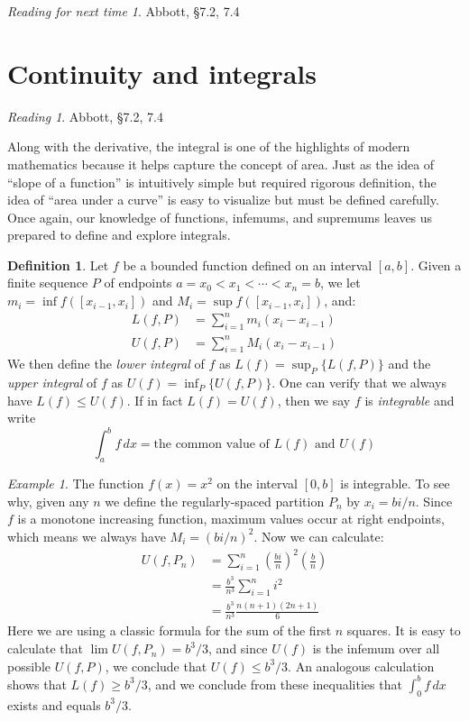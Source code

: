 \documentclass[11pt,oneside]{amsbook}
\theoremstyle{definition}
\theoremstyle{plain}
\theoremstyle{definition}
\newtheorem{definition}[theorem]{Definition}
\theoremstyle{remark}
\newtheorem{example}[theorem]{Example}
\newtheorem*{reading}{Reading}
\newtheorem*{readnext}{Reading for next time}
\numberwithin{equation}{section}
\numberwithin{figure}{section}
\begin{document}
\begin{readnext}
  Abbott, \S 7.2, 7.4
\end{readnext}

\newpage
\section{Continuity and integrals}

\begin{reading}
  Abbott, \S 7.2, 7.4
\end{reading}

Along with the derivative, the integral is one of the highlights of modern mathematics because it helps capture the concept of area. Just as the idea of ``slope of a function'' is intuitively simple but required rigorous definition, the idea of ``area under a curve'' is easy to visualize but must be defined carefully. Once again, our knowledge of functions, infemums, and supremums leaves us prepared to define and explore integrals.

\begin{definition}
  Let $f$ be a bounded function defined on an interval $[a,b]$. Given a finite sequence $P$ of endpoints $a=x_0<x_1<\cdots<x_n=b$, we let $m_i=\inf f([x_{i-1},x_i])$ and $M_i=\sup f([x_{i-1},x_i])$, and:
  \begin{align*}
    L(f,P)&=\sum_{i=1}^n m_i(x_i-x_{i-1})\\
    U(f,P)&=\sum_{i=1}^n M_i(x_i-x_{i-1})
  \end{align*}
  We then define the \emph{lower integral} of $f$ as $L(f)=\sup_P\{L(f,P)\}$ and the \emph{upper integral} of $f$ as $U(f)=\inf_P\{U(f,P)\}$. One can verify that we always have $L(f)\leq U(f)$. If in fact $L(f)=U(f)$, then we say $f$ is \emph{integrable} and write
  \[\int_a^bf\,dx=\text{the common value of }L(f)\text{ and }U(f)
  \]
\end{definition}

\begin{example}
  The function $f(x)=x^2$ on the interval $[0,b]$ is integrable. To see why, given any $n$ we define the regularly-spaced partition $P_n$ by $x_i=bi/n$. Since $f$ is a monotone increasing function, maximum values occur at right endpoints, which means we always have $M_i=(bi/n)^2$. Now we can calculate:
  \begin{align*}
    U(f,P_n)&=\sum_{i=1}^n\left(\frac{bi}{n}\right)^2\left(\frac{b}{n}\right)\\
    &=\frac{b^3}{n^3}\sum_{i=1}^n i^2\\
    &=\frac{b^3}{n^3}\frac{n(n+1)(2n+1)}{6}
  \end{align*}
  Here we are using a classic formula for the sum of the first $n$ squares. It is easy to calculate that $\lim U(f,P_n)=b^3/3$, and since $U(f)$ is the infemum over all possible $U(f,P)$, we conclude that $U(f)\leq b^3/3$. An analogous calculation shows that $L(f)\geq b^3/3$, and we conclude from these inequalities that $\int_0^bf\,dx$ exists and equals $b^3/3$.
\end{example}
\end{document}
